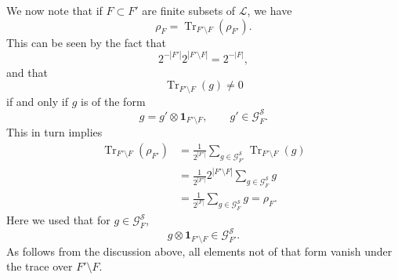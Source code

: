 \documentclass[aps,pra,reprint,superscriptaddress]{revtex4-2}
\newcommand{\cG}{{\mathcal G}}
\newcommand{\cL}{{\mathcal L}}
\newcommand{\cS}{{\mathcal S}}
\newcommand{\id}{\mathbf 1}
\theoremstyle{definition}
\theoremstyle{remark}
\begin{document}
We now note that if $F\subset F'$ are finite subsets of $\cL$, we have
\begin{equation}\label{eq:rho-compatibility}
    \rho_F=\operatorname{Tr}_{F'\setminus F}(\rho_{F'}).
\end{equation}
This can be seen by the fact that
\begin{equation}
    2^{-|F'|}2^{|F'\setminus F|}=2^{-|F|},
\end{equation}
and that
\begin{equation}
    \operatorname{Tr}_{F'\setminus F}(g)\neq0
\end{equation}
if and only if $g$ is of the form
\begin{equation}
    g=g'\otimes\id_{F'\setminus F},
    \qquad g'\in\cG^{\cS}_{F}.
\end{equation}
This in turn implies
\begin{align}
    \operatorname{Tr}_{F'\setminus F}(\rho_{F'})
    &=\frac{1}{2^{|F'|}}
      \sum_{g\in \cG^{\cS}_{F'}}
      \operatorname{Tr}_{F'\setminus F}(g) 
      \\
      \nonumber
    &=\frac{1}{2^{|F'|}}2^{|F'\setminus F|}
      \sum_{g\in\cG^{\cS}_{F}}g \\
       \nonumber
    &=\frac{1}{2^{|F|}}\sum_{g\in\cG^{\cS}_{F}}g
      =\rho_F.
       \nonumber
\end{align}
Here we used that for $g\in\cG^{\cS}_{F}$,
\begin{equation}
    g\otimes\id_{F'\setminus F}\in \cG^{\cS}_{F'}.
\end{equation}
As follows from the discussion above, all elements not of that form vanish
under the trace over $F'\setminus F$.
\end{document}
